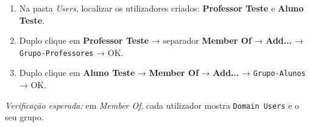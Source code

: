 
\begin{enumerate}
\item Na pasta \emph{Users}, localizar os utilizadores criados: \textbf{Professor Teste} e \textbf{Aluno Teste}.
\item Duplo clique em \textbf{Professor Teste} → separador \textbf{Member Of} → \textbf{Add...} → \texttt{Grupo-Professores} → OK.
\item Duplo clique em \textbf{Aluno Teste} → \textbf{Member Of} → \textbf{Add...} → \texttt{Grupo-Alunos} → OK.
\end{enumerate}

\emph{Verificação esperada:} em \emph{Member Of}, cada utilizador mostra \texttt{Domain Users} e o seu grupo.

